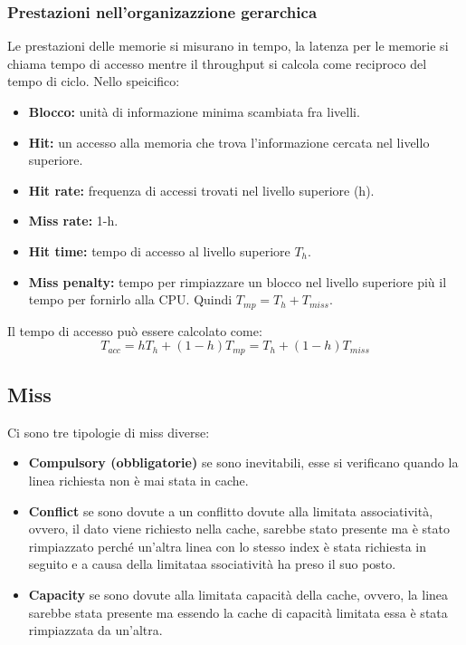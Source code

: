 \documentclass{article}
\begin{document}
\subsubsection{Prestazioni nell'organizazzione gerarchica}
Le prestazioni delle memorie si misurano in tempo, la latenza per le memorie si chiama tempo di accesso mentre il throughput si calcola come reciproco del tempo di ciclo.
Nello speicifico:
\begin{itemize}
    \item \textbf{Blocco:} unità di informazione minima scambiata fra livelli.
    \item \textbf{Hit:} un accesso alla memoria che trova l'informazione cercata nel livello superiore.
    \item \textbf{Hit rate:}  frequenza di accessi trovati nel livello superiore (h).
    \item \textbf{Miss rate:} 1-h.
    \item \textbf{Hit time:} tempo di accesso al livello superiore $T_h$.
    \item \textbf{Miss penalty:} tempo per rimpiazzare un blocco nel livello superiore più il tempo per fornirlo alla CPU. Quindi $T_{mp} = T_h + T_{miss}$.
\end{itemize}
Il tempo di accesso può essere calcolato come:
\[
    T_{acc} = h T_h + (1-h)T_{mp} = T_h + (1-h)T_{miss}
\]

\subsection{Miss}
Ci sono tre tipologie di miss diverse:
\begin{itemize}
    \item \textbf{Compulsory (obbligatorie)} se sono inevitabili, esse si verificano quando la linea richiesta non è mai stata in cache.
    \item \textbf{Conflict} se sono dovute a un conflitto dovute alla limitata associatività, ovvero, il dato viene richiesto nella cache, sarebbe stato presente ma è stato rimpiazzato perché un'altra linea con lo stesso index è stata richiesta in seguito e a causa della limitataa ssociatività ha preso il suo posto.
    \item \textbf{Capacity} se sono dovute alla limitata capacità della cache, ovvero, la linea sarebbe stata presente ma essendo la cache di capacità limitata essa è stata rimpiazzata da un’altra.
\end{itemize}
\end{document}
